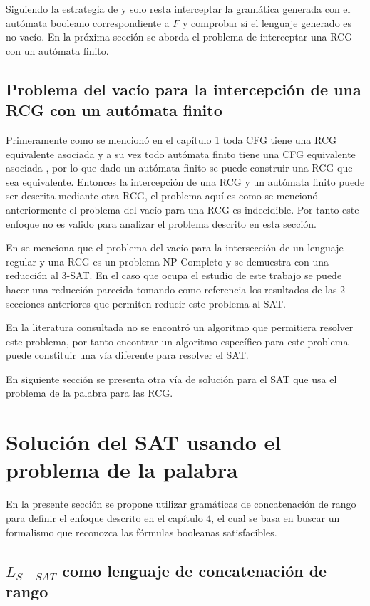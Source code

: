 Siguiendo la estrategia de \cite{aCFSAT} y \cite{aSRCSAT} solo resta interceptar la gramática generada con el autómata
booleano correspondiente a $F$ y comprobar si el lenguaje generado es no vacío. En la próxima sección se aborda el problema de interceptar una RCG con un autómata finito.

\subsection{Problema del vacío para la intercepción de una RCG con un autómata finito}

Primeramente como se mencionó en el capítulo 1 toda CFG tiene una RCG equivalente asociada y a su vez todo
autómata finito tiene una CFG equivalente asociada \cite{authomataTheory}, por lo que dado un autómata finito
se puede construir una RCG que sea equivalente.  Entonces la intercepción de una RCG y un autómata finito puede
ser descrita mediante otra RCG, el problema aquí es como se mencionó anteriormente el problema del vacío para
una RCG es indecidible. Por tanto este enfoque no es valido para analizar el problema descrito en esta sección.

En \cite{propertiesRCGBib1} se menciona que el problema del vacío para la intersección de un lenguaje regular
y una RCG es un problema NP-Completo y se demuestra con una reducción al 3-SAT. En el caso que ocupa el estudio
de este trabajo se puede hacer una reducción parecida tomando como referencia los resultados de las 2 secciones
anteriores que permiten reducir este problema al SAT.

En la literatura consultada no se encontró un algoritmo que permitiera resolver este problema, por tanto encontrar
un algoritmo específico para este problema puede constituir una vía diferente para resolver el SAT.

En siguiente sección se presenta otra vía de solución para el SAT que usa el problema de la palabra para las RCG.

\section{Solución del SAT usando el problema de la palabra}

En la presente sección se propone utilizar gramáticas de concatenación de rango para definir
el enfoque descrito en el capítulo 4, el cual se basa en buscar un formalismo que reconozca las
fórmulas booleanas satisfacibles.

\subsection{$L_{S-SAT}$ como lenguaje de concatenación de rango}

